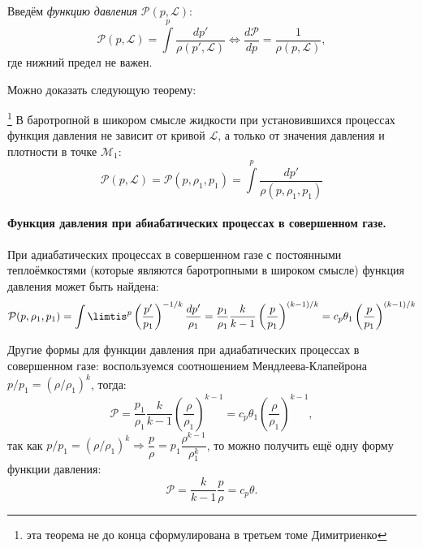 Введём \emph{функцию давления} $\mathcal{P} (p, \mathcal{L})$:
\[
  \mathcal{P} (p, \mathcal{L}) = \int\limits^p \dfrac{dp'}{\rho(p', \mathcal{L})}
  \Leftrightarrow
  \dfrac{d\mathcal{P}}{dp} = \dfrac{1}{\rho(p, \mathcal{L})},
\]
где нижний предел не важен.

Можно доказать следующую теорему:
\begin{theorem}\footnote{эта теорема не до конца сформулирована в третьем томе Димитриенко}
  В баротропной в шикором смысле жидкости при установившихся процессах 
  функция давления не зависит от кривой $\mathcal{L}$, а только от значения давления
  и плотности в точке $\mathcal{M}_1$:
  \[
    \mathcal{P}(p, \mathcal{L}) = \mathcal{P}(p, \rho_1, p_1) = \int\limits^p \dfrac{dp'}{\rho(p, \rho_1, p_1)}
  \]
\end{theorem}

\paragraph{Функция давления при абиабатических процессах в совершенном газе.}
При адиабатических процессах в совершенном газе с постоянными теплоёмкостями (которые
являются баротропными в широком смысле) функция давления может быть найдена:
\[
  \mathcal{P}(p, \rho_1, p_1) = \int\limtis^p \left( \dfrac{p'}{p_1} \right)^{- 1/k} \dfrac{dp'}{\rho_1} = \dfrac{p_1}{\rho_1} \dfrac{k}{k-1} \left( \dfrac{p}{p_1} \right)^{(k-1)/k} =
  c_p \theta_1 \left( \dfrac{p}{p_1} \right)^{(k-1)/k}
\]

Другие формы для функции давления при адиабатических процессах в совершенном газе:
воспользуемся соотношением Мендлеева-Клапейрона $p / p_1 = \left( \rho / \rho_1 \right)^k $,
тогда:
\[
  \mathcal{P} = \dfrac{p_1}{\rho_1} \dfrac{k}{k-1} \left( \dfrac{\rho}{\rho_1} \right)^{k-1} =
  c_p \theta_1 \left( \dfrac{\rho}{\rho_1} \right)^{k-1},
\]
так как $p / p_1 = \left( \rho / \rho_1 \right)^k \Rightarrow \dfrac{p}{\rho} = p_1 \dfrac{\rho^{k-1}}{\rho_1^k}$, то можно получить ещё одну форму функции давления:
\[
  \mathcal{P} = \dfrac{k}{k-1} \dfrac{p}{\rho} = c_p \theta.
\]
